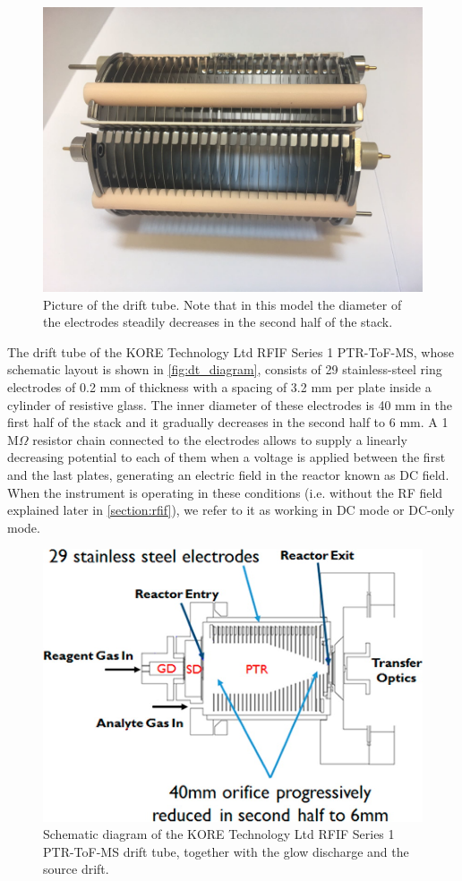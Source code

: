 \begin{figure}%
\centering
\includegraphics[width=0.6\linewidth]{pics/IMG-20170119-WA0008.png}
\centering
\caption[Picture of the drift tube.]{Picture of the drift tube. Note that in this model the diameter of the electrodes steadily decreases in the second half of the stack.}
\label{fig:dt}
\end{figure}



The drift tube of the KORE Technology Ltd RFIF Series 1 PTR-ToF-MS, whose schematic layout is shown in \autoref{fig:dt_diagram}, consists of 29 stainless-steel ring electrodes of 0.2 mm of thickness with a spacing of 3.2 mm per plate inside a cylinder of resistive glass.
The inner diameter of these electrodes is 40 mm in the first half of the stack and it gradually decreases in the second half to 6 mm.
A 1 M$\Omega$ resistor chain connected to the electrodes allows to supply a linearly decreasing potential to each of them when a voltage is applied between the first and the last plates, generating an electric field in the reactor known as DC field.
When the instrument is operating in these conditions (i.e. without the RF field explained later in \autoref{section:rfif}), we refer to it as working in DC mode or DC-only mode.

\begin{figure}[t]
\centering
\includegraphics[width=0.6\linewidth]{pics/ac-2016-02982x_0002.png}
\centering
\caption{Schematic diagram of the KORE Technology Ltd RFIF Series 1 PTR-ToF-MS drift tube, together with the glow discharge and the source drift.}
\label{fig:dt_diagram}
\end{figure}

